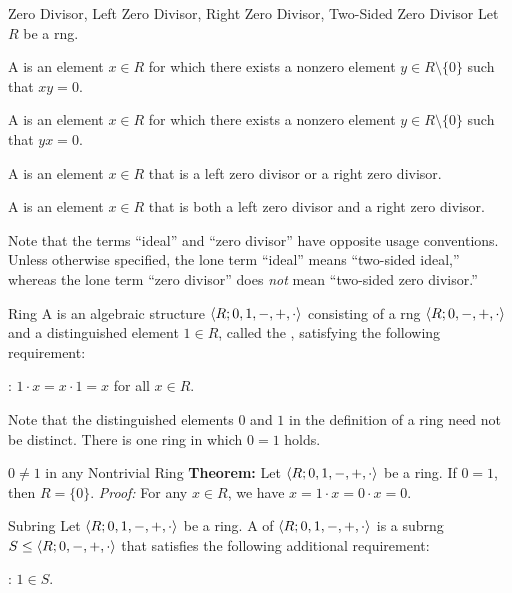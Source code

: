 \begin{dfnbox}{Zero Divisor, Left Zero Divisor, Right Zero Divisor, Two-Sided Zero Divisor}
	Let $R$ be a rng.
	\begin{dfnitems}
		\item A  is an element $x \in R$ for which there exists a nonzero element $y \in R \setminus \{0\}$ such that $xy = 0$.
		\item A  is an element $x \in R$ for which there exists a nonzero element $y \in R \setminus \{0\}$ such that $yx = 0$.
		\item A  is an element $x \in R$ that is a left zero divisor or a right zero divisor.
		\item A  is an element $x \in R$ that is both a left zero divisor and a right zero divisor.
	\end{dfnitems}
\end{dfnbox}

Note that the terms ``ideal'' and ``zero divisor'' have opposite usage conventions. Unless otherwise specified, the lone term ``ideal'' means ``two-sided ideal,'' whereas the lone term ``zero divisor'' does \textit{not} mean ``two-sided zero divisor.''

\begin{dfnbox}{Ring}
	A  is an algebraic structure ${\langle {R; 0, 1, -, +, \cdot} \rangle}$ consisting of a rng ${\langle {R; 0, -, +, \cdot} \rangle}$ and a distinguished element $1 \in R$, called the , satisfying the following requirement:
	\begin{dfnitems}
		\item {}: $1 \cdot x = x \cdot 1 = x$ for all $x \in R$.
	\end{dfnitems}
\end{dfnbox}

Note that the distinguished elements $0$ and $1$ in the definition of a ring need not be distinct. There is one ring in which $0 = 1$ holds.

\begin{thmbox}{$0 \ne 1$ in any Nontrivial Ring}
	\textbf{Theorem:} Let ${\langle {R; 0, 1, -, +, \cdot} \rangle}$ be a ring. If $0 = 1$, then $R = \{0\}$.
	\tcblower
	\textit{Proof:} For any $x \in R$, we have $x = 1 \cdot x = 0 \cdot x = 0$.
\end{thmbox}

\begin{dfnbox}{Subring}
	Let ${\langle {R; 0, 1, -, +, \cdot} \rangle}$ be a ring. A  of ${\langle {R; 0, 1, -, +, \cdot} \rangle}$ is a subrng $S \le {\langle {R; 0, -, +, \cdot} \rangle}$ that satisfies the following additional requirement:
	\begin{dfnitems}
		\item {}: $1 \in S$.
	\end{dfnitems}
\end{dfnbox}

